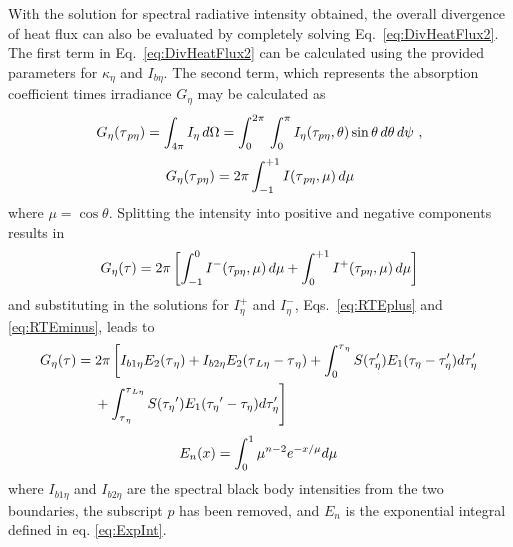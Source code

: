 With the solution for spectral radiative intensity obtained, the overall divergence of heat flux can also be evaluated by completely solving Eq.~\ref{eq:DivHeatFlux2}. The first term in Eq.~\ref{eq:DivHeatFlux2} can be calculated using the provided parameters for $\kappa_\eta$ and $I_{b\eta}$. The second term, which represents the absorption coefficient times irradiance $G_\eta$ may be calculated as
\begin{equation}
    \centering
    G_\eta{}(\tau{}_{p\eta})=\int_{4\pi}I_\eta \, d\Omega{}
    =\int_0^{2\pi}{}\int_0^{\pi}I_\eta(\tau_{p\eta},\theta)\sin{\theta} \, d\theta{} \,d\psi{} \ ,
\end{equation}
\begin{equation}
    \centering
    G_\eta{}(\tau{}_{p\eta})=2\pi{}\int_{-1}^{+1}I(\tau{}_{p\eta},\mu) \,d\mu
\end{equation}
where $\mu=\cos{\theta}$. Splitting the intensity into positive and negative components results in
\begin{equation}
    \centering
    G_\eta{}(\tau{})=2\pi{}\left[\int_{-1}^0{} I^-(\tau_{p\eta},\mu)\, d\mu{} + 
    \int_{0}^{+1} I^+(\tau_{p\eta},\mu)\, d\mu{} \right]
\end{equation}
and substituting in the solutions for $I^+_\eta$ and $I^-_\eta$, Eqs.~\ref{eq:RTEplus} and \ref{eq:RTEminus}, leads to
\begin{equation}
\begin{split}
    G_\eta{}(\tau{})&=2\pi{} \left[ I_{b1\eta}E_2(\tau{}_\eta{})+I_{b2\eta}E_2(\tau{}_{L\eta}-\tau{}_\eta{})+\int_0^{\tau{}_\eta{}}S(\tau_\eta')E_1(\tau_\eta-\tau_\eta')d\tau_\eta' \right. \\
    &\quad \left. {}+\int^{\tau{}_{L\eta}}_{\tau{}_\eta{}}S(\tau_\eta{}')E_1(\tau_\eta{}'-\tau_\eta)d\tau_\eta' \vphantom{\frac12}\right]
    \label{eq:IrrPlaneParallel}
\end{split}
\end{equation}
\begin{equation}
    \centering
    E_n(x)=\int_0^1\mu{}^{n-2}e^{-x/\mu{}}d\mu{} \,
    \label{eq:ExpInt}
\end{equation}
where $I_{b1\eta}$ and $I_{b2\eta}$ are the spectral black body intensities from the two boundaries, the subscript $p$ has been removed, and $E_n$ is the exponential integral defined in eq. \ref{eq:ExpInt}. 

